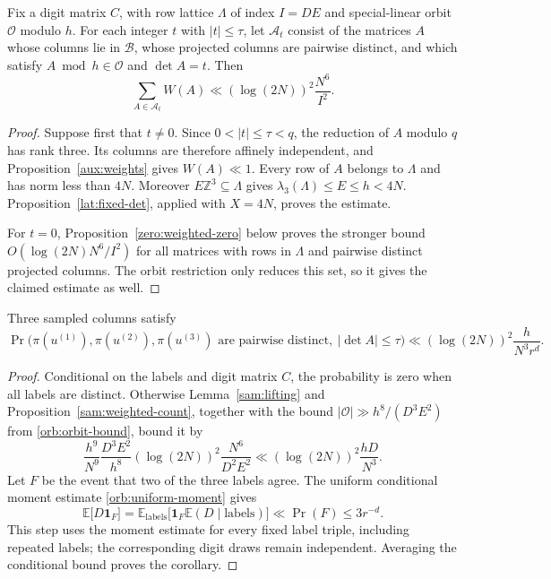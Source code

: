 \begin{proposition}
\label{sam:weighted-count}
Fix a digit matrix $C$, with row lattice $\Lambda$ of index $I=DE$ and
special-linear orbit $\mathcal O$ modulo $h$.  For each integer
$t$ with $|t|\le\tau$, let $\mathcal A_t$ consist of the matrices $A$ whose
columns lie in $\mathcal B$, whose projected columns are pairwise
distinct, and which satisfy $A\bmod h\in\mathcal O$ and $\det A=t$.
Then
\begin{equation}\label{sam:weighted-estimate}
 \sum_{A\in\mathcal A_t}W(A)
 \ll (\log(2N))^2\frac{N^6}{I^2}.
\end{equation}
\end{proposition}
\begin{proof}
Suppose first that $t\ne0$.  Since $0<|t|\le\tau<q$, the reduction of
$A$ modulo $q$ has rank three.  Its columns are therefore affinely
independent, and Proposition~\ref{aux:weights} gives $W(A)\ll1$.
Every row of $A$ belongs to $\Lambda$ and has norm less than $4N$.
Moreover $E\mathbb Z^3\subseteq\Lambda$ gives
$\lambda_3(\Lambda)\le E\le h<4N$.  Proposition~\ref{lat:fixed-det},
applied with $X=4N$, proves the estimate.

For $t=0$, Proposition~\ref{zero:weighted-zero} below proves the stronger
bound $O(\log(2N)N^6/I^2)$ for all matrices with rows in $\Lambda$ and
pairwise distinct projected columns.  The orbit restriction only reduces
this set, so it gives the claimed estimate as well.
\end{proof}

\begin{corollary}\label{sam:bad-triple}
Three sampled columns satisfy
\begin{equation}\label{sam:triple-bound}
 \Pr\bigl(\pi(u^{(1)}),\pi(u^{(2)}),\pi(u^{(3)})
       \text{ are pairwise distinct},\ |\det A|\le\tau\bigr)
 \ll (\log(2N))^2\frac{h}{N^3r^d}.
\end{equation}
\end{corollary}
\begin{proof}
Conditional on the labels and digit matrix $C$, the probability is zero
when all labels are distinct.  Otherwise Lemma~\ref{sam:lifting} and
Proposition~\ref{sam:weighted-count}, together with the bound
$|\mathcal O|\gg h^8/(D^3E^2)$ from \eqref{orb:orbit-bound}, bound it by
\[
 \frac{h^9}{N^9}\frac{D^3E^2}{h^8}
 (\log(2N))^2\frac{N^6}{D^2E^2}
 \ll (\log(2N))^2\frac{hD}{N^3}.
\]
Let $F$ be the event that two of the three labels agree.  The uniform
conditional moment estimate \eqref{orb:uniform-moment} gives
\[
 \mathbb E\bigl[D\mathbf1_F\bigr]
 =\mathbb E_{\mathrm{labels}}
   \bigl[\mathbf1_F\mathbb E(D\mid\mathrm{labels})\bigr]
 \ll\Pr(F)\le 3r^{-d}.
\]
This step uses the moment estimate for every fixed label triple, including
repeated labels; the corresponding digit draws remain independent.
Averaging the conditional bound proves the corollary.
\end{proof}
